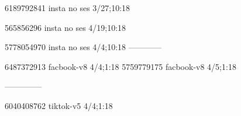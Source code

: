 6189792841 insta no ses
3/27;10:18

565856296 insta no ses
4/19;10:18

5778054970 insta no ses
4/4;10:18
------------

6487372913 facbook-v8
4/4;1:18
5759779175 facbook-v8
4/5;1:18


--------------

6040408762 tiktok-v5
4/4;1:18
